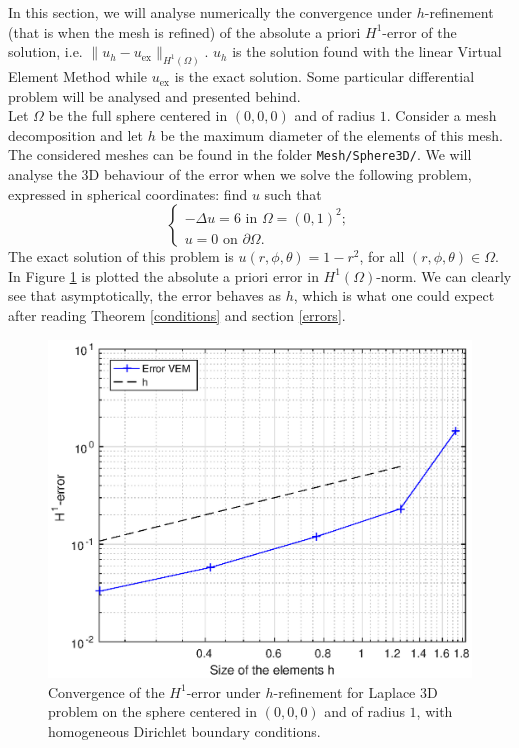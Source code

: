 In this section, we will analyse numerically the convergence under $h$-refinement (that is when the mesh is refined) of the absolute a priori $H^1$-error of the solution, i.e. $\|u_h-u_{\text{ex}}\|_{H^1(\Omega)}$. $u_h$ is the solution found with the linear Virtual Element Method while $u_{\text{ex}}$ is the exact solution. Some particular differential problem will be analysed and presented behind.\\

Let $\Omega$ be the full sphere centered in $(0,0,0)$ and of radius $1$. Consider a mesh decomposition and let $h$ be the maximum diameter of the elements of this mesh. The considered meshes can be found in the folder \verb!Mesh/Sphere3D/!. We will analyse the $3$D behaviour of the error when we solve the following problem, expressed in spherical coordinates: find $u$ such that 
\begin{equation*}
\begin{cases}
-\Delta u = 6 \text{ in } \Omega = (0,1)^2;\\
u = 0 \text{ on } \partial \Omega.
\end{cases}
\end{equation*}
The exact solution of this problem is $u(r,\phi,\theta)=1-r^2$, for all $(r,\phi,\theta)\in\Omega$. \\

In Figure \ref{img:convSphere} is plotted the absolute a priori error in $H^1(\Omega)$-norm. We can clearly see that asymptotically, the error behaves as $h$, which is what one could expect after reading Theorem \ref{conditions} and section \ref{errors}. 

\begin{figure}[!h]
\centering
\includegraphics[scale=0.8]{images/convergenceSpherePlot3D.eps}
\caption{Convergence of the $H^1$-error under $h$-refinement for Laplace 3D problem on the sphere centered in $(0,0,0)$ and of radius $1$, with homogeneous Dirichlet boundary conditions.}
\label{img:convSphere}
\end{figure}

